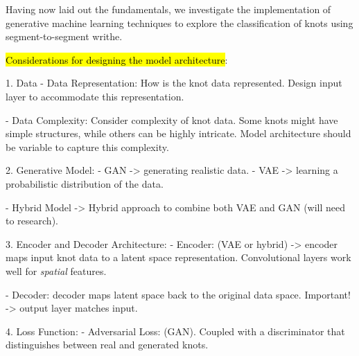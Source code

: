 


Having now laid out the fundamentals, we investigate the implementation of generative machine learning techniques to explore the classification of knots using segment-to-segment writhe.

\hl{Considerations for designing the model architecture}:

    1. Data
   - Data Representation: How is the knot data represented. Design input layer to accommodate this representation.

   - Data Complexity: Consider complexity of knot data. Some knots might have simple structures, while others can be highly intricate. Model architecture should be variable to capture this complexity.

    2. Generative Model:
   - GAN -> generating realistic data.
   - VAE -> learning a probabilistic distribution of the data.

   - Hybrid Model -> Hybrid approach to combine both VAE and GAN (will need to research).

    3. Encoder and Decoder Architecture:
   - Encoder: (VAE or hybrid) -> encoder maps input knot data to a latent space representation. 
   Convolutional layers work well for \emph{spatial} features.

   - Decoder: decoder maps latent space back to the original data space. 
   Important! -> output layer matches input.

    4. Loss Function:
   - Adversarial Loss: (GAN). Coupled with a discriminator that distinguishes between real and generated knots.

